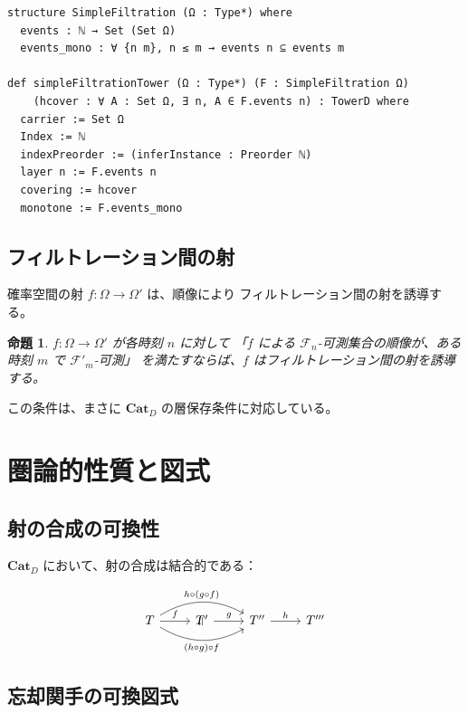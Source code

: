 \documentclass[a4paper,12pt]{ltjsarticle}
\newtheorem{proposition}[theorem]{命題}
\begin{document}
\begin{verbatim}
structure SimpleFiltration (Ω : Type*) where
  events : ℕ → Set (Set Ω)
  events_mono : ∀ {n m}, n ≤ m → events n ⊆ events m

def simpleFiltrationTower (Ω : Type*) (F : SimpleFiltration Ω)
    (hcover : ∀ A : Set Ω, ∃ n, A ∈ F.events n) : TowerD where
  carrier := Set Ω
  Index := ℕ
  indexPreorder := (inferInstance : Preorder ℕ)
  layer n := F.events n
  covering := hcover
  monotone := F.events_mono
\end{verbatim}

\subsection{フィルトレーション間の射}

確率空間の射 $f: \Omega \to \Omega'$ は、順像により
フィルトレーション間の射を誘導する。

\begin{proposition}
$f: \Omega \to \Omega'$ が各時刻 $n$ に対して
「$f$ による $\mathcal{F}_n$-可測集合の順像が、ある時刻 $m$ で $\mathcal{F}'_m$-可測」
を満たすならば、$f$ はフィルトレーション間の射を誘導する。
\end{proposition}

この条件は、まさに $\mathbf{Cat}_D$ の層保存条件に対応している。

\section{圏論的性質と図式}

\subsection{射の合成の可換性}

$\mathbf{Cat}_D$ において、射の合成は結合的である：

\begin{equation*}
\begin{tikzcd}
T \arrow[r, "f"] \arrow[rr, bend left, "h \circ (g \circ f)"{name=U}]
  \arrow[rr, bend right, "(h \circ g) \circ f"'{name=D}]
  & T' \arrow[r, "g"]
  & T'' \arrow[r, "h"]
  & T'''
\arrow[phantom, from=U, to=D, "\rotatebox{90}{$=$}"]
\end{tikzcd}
\end{equation*}

\subsection{忘却関手の可換図式}
\end{document}
